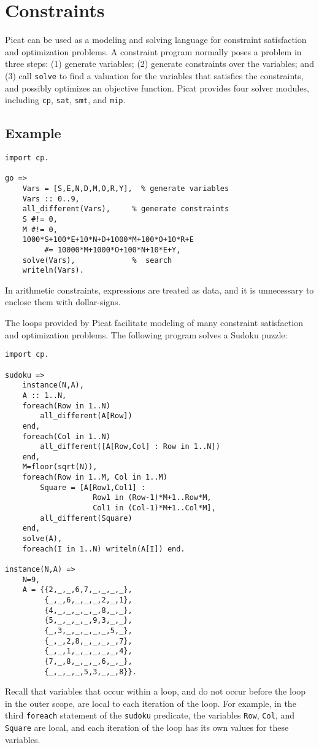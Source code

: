 \section{\label{section:Constraints}Constraints}
Picat can be used as a modeling and solving language for constraint satisfaction and optimization problems.  A constraint program normally poses a problem in three steps: (1) generate variables; (2) generate constraints over the variables; and (3) call \texttt{solve} to find a valuation for the variables that satisfies the constraints, and possibly optimizes an objective function. Picat provides four solver modules, including \texttt{cp}, \texttt{sat}, \texttt{smt}, and \texttt{mip}.

\subsection*{Example}
\begin{verbatim}
import cp.

go => 
    Vars = [S,E,N,D,M,O,R,Y],  % generate variables
    Vars :: 0..9,
    all_different(Vars),     % generate constraints
    S #!= 0,
    M #!= 0,
    1000*S+100*E+10*N+D+1000*M+100*O+10*R+E 
         #= 10000*M+1000*O+100*N+10*E+Y,
    solve(Vars),             %  search
    writeln(Vars).
\end{verbatim}
In arithmetic constraints, expressions are treated as data, and it is unnecessary to enclose them with dollar-signs.

The loops provided by Picat facilitate modeling of many constraint satisfaction and optimization problems. The following program solves a Sudoku puzzle:
\begin{verbatim}
import cp.

sudoku =>
    instance(N,A),
    A :: 1..N,
    foreach(Row in 1..N)
        all_different(A[Row])
    end,
    foreach(Col in 1..N)
        all_different([A[Row,Col] : Row in 1..N])
    end,
    M=floor(sqrt(N)),
    foreach(Row in 1..M, Col in 1..M) 
        Square = [A[Row1,Col1] : 
                    Row1 in (Row-1)*M+1..Row*M, 
                    Col1 in (Col-1)*M+1..Col*M],
        all_different(Square)
    end,
    solve(A),
    foreach(I in 1..N) writeln(A[I]) end.

instance(N,A) =>
    N=9,
    A = {{2,_,_,6,7,_,_,_,_},
         {_,_,6,_,_,_,2,_,1},
         {4,_,_,_,_,_,8,_,_},
         {5,_,_,_,_,9,3,_,_},
         {_,3,_,_,_,_,_,5,_},
         {_,_,2,8,_,_,_,_,7},
         {_,_,1,_,_,_,_,_,4},
         {7,_,8,_,_,_,6,_,_},
         {_,_,_,_,5,3,_,_,8}}.
\end{verbatim}
Recall that variables that occur within a loop, and do not occur before the loop in the outer scope, are local to each iteration of the loop. For example, in the third \texttt{foreach} statement of the \texttt{sudoku} predicate, the variables \texttt{Row}, \texttt{Col}, and \texttt{Square} are local, and each iteration of the loop has its own values for these variables.

